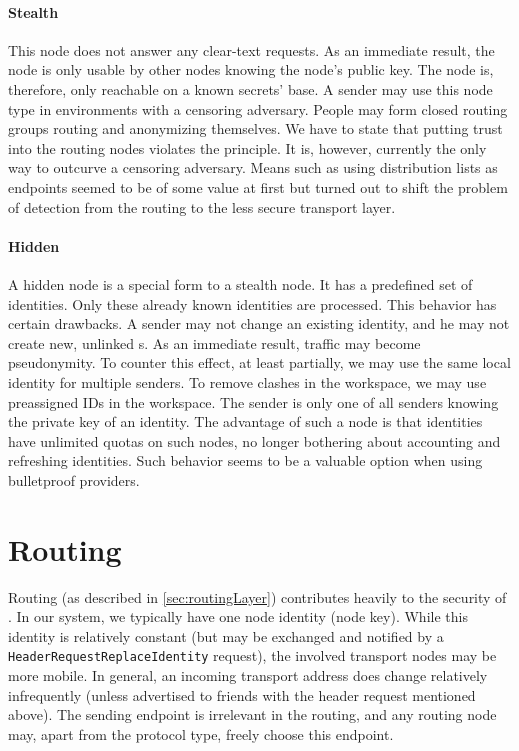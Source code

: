 \subsubsection{Stealth \VortexNode}\label{sec:stealthNode}
This node does not answer any clear-text requests. As an immediate result, the node is only usable by other nodes knowing the node's public key. The node is, therefore, only reachable on a known secrets' base. A sender may use this node type in environments with a censoring adversary. People may form closed routing groups routing and anonymizing themselves. We have to state that putting trust into the routing nodes violates the  principle. It is, however, currently the only way to outcurve a censoring adversary. Means such as using distribution lists as endpoints seemed to be of some value at first but turned out to shift the problem of detection from the routing to the less secure transport layer.

\subsubsection{Hidden \VortexNode}\label{sec:hiddenNode}
A hidden node is a special form to a stealth node. It has a predefined set of identities. Only these already known identities are processed. This behavior has certain drawbacks. A sender may not change an existing identity, and he may not create new, unlinked  s. As an immediate result, traffic may become pseudonymity. To counter this effect, at least partially, we may use the same local identity for multiple senders. To remove clashes in the workspace, we may use preassigned IDs in the workspace. The sender is only one of all senders knowing the private key of an identity. The advantage of such a node is that identities have unlimited quotas on such nodes, no longer bothering about accounting and refreshing identities. Such behavior seems to be a valuable option when using bulletproof providers.

\chapter{Routing}\label{sec:routingConcerns}
Routing (as described in \cref{sec:routingLayer}) contributes heavily to the security of \MessageVortex. In our system, we typically have one node identity (node key). While this identity is relatively constant (but may be exchanged and notified by a \texttt{HeaderRequestReplaceIdentity} request), the involved transport nodes may be more mobile. In general, an incoming transport address does change relatively infrequently (unless advertised to friends with the header request mentioned above). The sending endpoint is irrelevant in the routing, and any routing node may, apart from the protocol type, freely choose this endpoint. 

